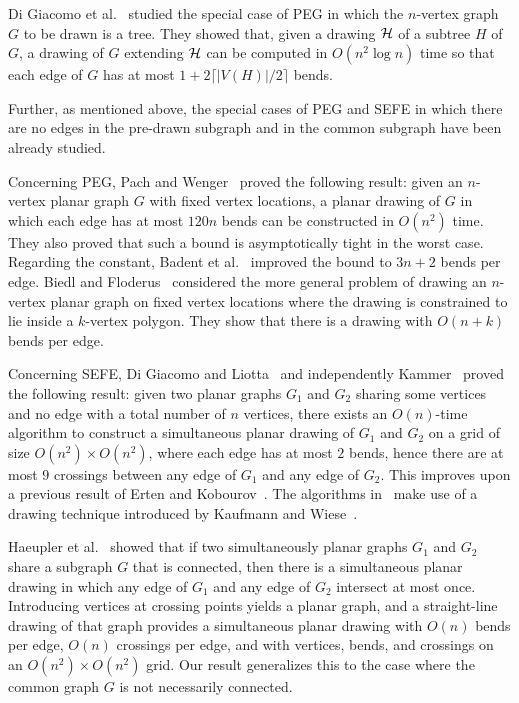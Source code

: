 \documentclass{llncs}
\begin{document}
Di Giacomo et al.~\cite{ddlmw-psetgpd-09} studied the special case of PEG in which the $n$-vertex graph $G$ to be drawn is a tree. They showed that, given a drawing $\cal H$ of a subtree $H$ of $G$, a drawing of $G$ extending $\cal H$ can be computed in $O(n^2\log n)$ time so that each edge of $G$ has at most $1+2\lceil{|V(H)|/2}\rceil$ bends.

Further, as mentioned above, the special cases of PEG and SEFE in which there are no edges in the pre-drawn subgraph and in the common subgraph have been already studied.

Concerning PEG, Pach and Wenger~\cite{PW01} proved the following result: given an $n$-vertex planar graph $G$ with fixed vertex locations, a planar drawing of $G$ in which each edge has at most $120n$ bends can be constructed in $O(n^2)$ time. They also proved that such a bound is asymptotically tight in the worst case.
Regarding the constant, Badent et al.~\cite{bgl-dcgcps-08} improved the bound to $3n+2$ bends per edge.
Biedl and Floderus~\cite{Biedl-Floderus} considered the more general problem of drawing an $n$-vertex planar graph on fixed vertex locations where the drawing is constrained to lie inside a $k$-vertex polygon.   They show that there is a drawing with $O(n+k)$ bends per edge.

Concerning SEFE, Di Giacomo and Liotta~\cite{dl-seogpc-07} and independently Kammer~\cite{k-setbepa-06} proved the following result: given two planar graphs $G_1$ and $G_2$ sharing some vertices and no edge with a total number of $n$ vertices, there exists an $O(n)$-time algorithm to construct a simultaneous planar drawing of $G_1$ and $G_2$ on a grid of size $O(n^2) \times O(n^2)$, where each edge has at most $2$ bends, hence there are at most $9$ crossings between any edge of $G_1$ and any edge of $G_2$. This improves upon a previous result of Erten and Kobourov~\cite{EK}. The algorithms in~\cite{dl-seogpc-07,EK,k-setbepa-06} make use of a drawing technique introduced by Kaufmann and Wiese~\cite{KW}.

Haeupler et al.~\cite{HJL} showed that if two simultaneously planar graphs $G_1$ and $G_2$ share a subgraph $G$ that is connected, then there is a simultaneous planar drawing in which any edge of $G_1$ and any edge of $G_2$ intersect at most once. Introducing vertices at crossing points yields a planar graph, and a straight-line drawing of that graph provides a simultaneous planar drawing with $O(n)$ bends per edge, $O(n)$ crossings per edge, and with vertices, bends, and crossings on an $O(n^2) \times O(n^2)$ grid. Our result generalizes this to the case where the common graph $G$ is not necessarily connected.
\end{document}
